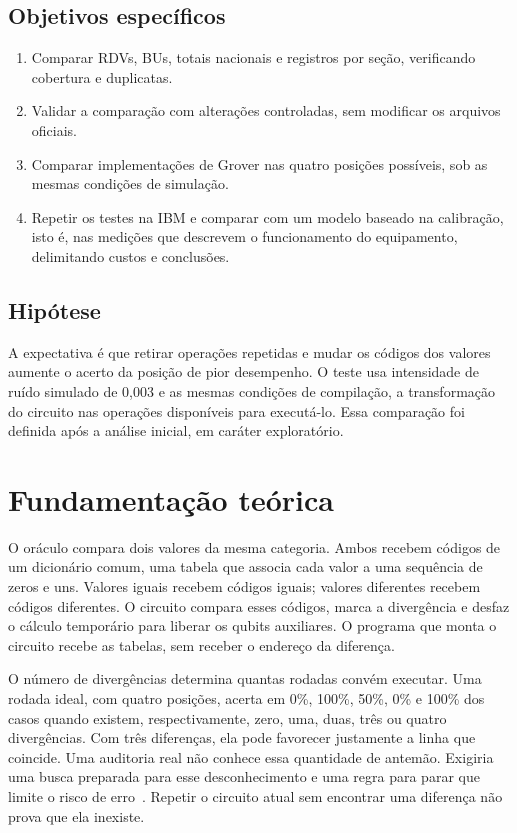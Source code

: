 \documentclass[conference]{IEEEtran}
\begin{document}
\subsection{Objetivos específicos}
\begin{enumerate}
\item Comparar RDVs, BUs, totais nacionais e registros por seção, verificando cobertura e duplicatas.
\item Validar a comparação com alterações controladas, sem modificar os arquivos oficiais.
\item Comparar implementações de Grover nas quatro posições possíveis, sob as mesmas condições de simulação.
\item Repetir os testes na IBM e comparar com um modelo baseado na calibração, isto é, nas medições que descrevem o funcionamento do equipamento, delimitando custos e conclusões.
\end{enumerate}

\subsection{Hipótese}
A expectativa é que retirar operações repetidas e mudar os códigos dos valores aumente o acerto da posição de pior desempenho. O teste usa intensidade de ruído simulado de 0,003 e as mesmas condições de compilação, a transformação do circuito nas operações disponíveis para executá-lo. Essa comparação foi definida após a análise inicial, em caráter exploratório.

\section{Fundamentação teórica}
O oráculo compara dois valores da mesma categoria. Ambos recebem códigos de um dicionário comum, uma tabela que associa cada valor a uma sequência de zeros e uns. Valores iguais recebem códigos iguais; valores diferentes recebem códigos diferentes. O circuito compara esses códigos, marca a divergência e desfaz o cálculo temporário para liberar os qubits auxiliares. O programa que monta o circuito recebe as tabelas, sem receber o endereço da diferença.

O número de divergências determina quantas rodadas convém executar. Uma rodada ideal, com quatro posições, acerta em 0\%, 100\%, 50\%, 0\% e 100\% dos casos quando existem, respectivamente, zero, uma, duas, três ou quatro divergências. Com três diferenças, ela pode favorecer justamente a linha que coincide. Uma auditoria real não conhece essa quantidade de antemão. Exigiria uma busca preparada para esse desconhecimento e uma regra para parar que limite o risco de erro~\cite{boyer1998,brassard2002}. Repetir o circuito atual sem encontrar uma diferença não prova que ela inexiste.
\end{document}
